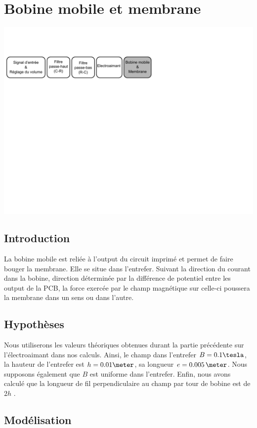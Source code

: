 \chapter{Bobine mobile et membrane}

\begin{center}
\includegraphics[width=\textwidth]{img/Schemabloc4}
\end{center}

\section{Introduction}
La bobine mobile est reliée à l'output du circuit imprimé et permet de faire bouger la membrane. Elle se situe dans 
l'entrefer. Suivant la direction du courant dans la bobine, direction déterminée par la différence de potentiel
entre les output de la PCB, la force exercée par le champ magnétique sur celle-ci poussera la 
membrane dans un sens ou dans l'autre.

\section{Hypothèses}
Nous utiliserons les valeurs théoriques obtenues durant la partie précédente sur l'électroaimant dans nos calculs.
Ainsi, le champ dans l'entrefer $B = 0.1\tesla$, la hauteur de l'entrefer est $h = 0.01\meter$, sa longueur 
$e = 0.005\,\meter$. Nous supposons également que $B$ est uniforme dans l'entrefer. Enfin, nous avons 
calculé que la longueur de fil perpendiculaire au champ par tour de bobine est de $2h$ .

\section{Modélisation}

